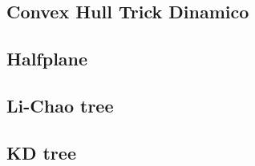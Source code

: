 \subsection{Convex Hull Trick Dinamico}


\subsection{Halfplane}


\subsection{Li-Chao tree}


\subsection{KD tree}


